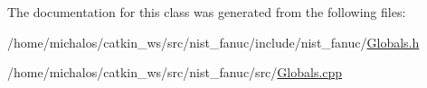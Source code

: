 The documentation for this class was generated from the following files\-:\begin{DoxyCompactItemize}
\item 
/home/michalos/catkin\-\_\-ws/src/nist\-\_\-fanuc/include/nist\-\_\-fanuc/\hyperlink{Globals_8h}{Globals.\-h}\item 
/home/michalos/catkin\-\_\-ws/src/nist\-\_\-fanuc/src/\hyperlink{Globals_8cpp}{Globals.\-cpp}\end{DoxyCompactItemize}
